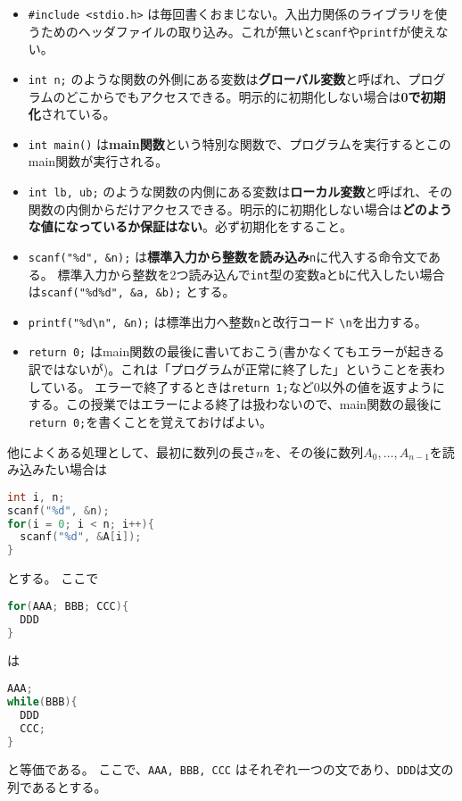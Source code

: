 \documentclass[a4paper,twoside,onecolumn,openany,article,10pt]{memoir}
\theoremstyle{remark}
\begin{document}
\begin{itemize}
\item \texttt{\#include <stdio.h>} は毎回書くおまじない。入出力関係のライブラリを使うためのヘッダファイルの取り込み。これが無いと\texttt{scanf}や\texttt{printf}が使えない。
\item \texttt{int n;} のような関数の外側にある変数は\textbf{グローバル変数}と呼ばれ、プログラムのどこからでもアクセスできる。明示的に初期化しない場合は\textbf{0で初期化}されている。
\item \texttt{int main()} は\textbf{main関数}という特別な関数で、プログラムを実行するとこのmain関数が実行される。
\item \texttt{int lb, ub;} のような関数の内側にある変数は\textbf{ローカル変数}と呼ばれ、その関数の内側からだけアクセスできる。明示的に初期化しない場合は\textbf{どのような値になっているか保証はない}。必ず初期化をすること。
\item \texttt{scanf("\%d", \&n);} は\textbf{標準入力から整数を読み込み}\texttt{n}に代入する命令文である。
標準入力から整数を2つ読み込んで\texttt{int}型の変数\texttt{a}と\texttt{b}に代入したい場合は\texttt{scanf("\%d\%d", \&a, \&b);} とする。
\item \texttt{printf("\%d\textbackslash n", \&n);} は標準出力へ整数\texttt{n}と改行コード \texttt{\textbackslash n}を出力する。
\item \texttt{return 0;} はmain関数の最後に書いておこう(書かなくてもエラーが起きる訳ではないが)。これは「プログラムが正常に終了した」ということを表わしている。
エラーで終了するときは\texttt{return 1;}など0以外の値を返すようにする。この授業ではエラーによる終了は扱わないので、main関数の最後に\texttt{return 0;}を書くことを覚えておけばよい。
\end{itemize}
他によくある処理として、最初に数列の長さ$n$を、その後に数列$A_0,\dotsc,A_{n-1}$を読み込みたい場合は
\begin{lstlisting}[basicstyle=\ttfamily\normalsize,showstringspaces=false,language=C,frame=single]
int i, n;
scanf("%d", &n);
for(i = 0; i < n; i++){
  scanf("%d", &A[i]);
}
\end{lstlisting}
とする。
ここで
\begin{lstlisting}[basicstyle=\ttfamily\normalsize,showstringspaces=false,language=C,frame=single]
for(AAA; BBB; CCC){
  DDD
}
\end{lstlisting}
は
\begin{lstlisting}[basicstyle=\ttfamily\normalsize,showstringspaces=false,language=C,frame=single]
AAA;
while(BBB){
  DDD
  CCC;
}
\end{lstlisting}
と等価である。
ここで、\texttt{AAA, BBB, CCC} はそれぞれ一つの文であり、\texttt{DDD}は文の列であるとする。
\end{document}
